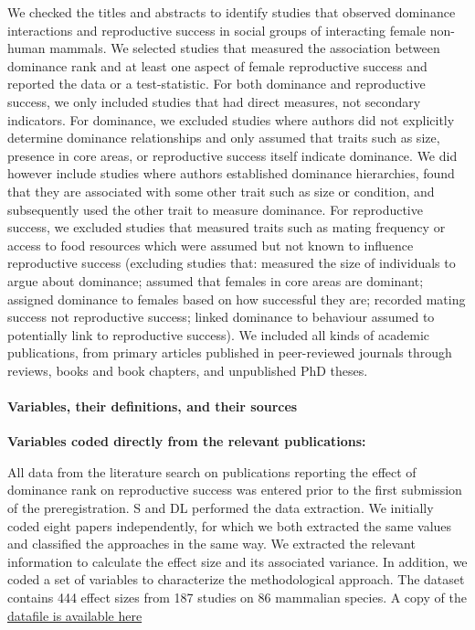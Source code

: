 \documentclass[
]{article}
\begin{document}
We checked the titles and abstracts to identify studies that observed
dominance interactions and reproductive success in social groups of
interacting female non-human mammals. We selected studies that measured
the association between dominance rank and at least one aspect of female
reproductive success and reported the data or a test-statistic. For both
dominance and reproductive success, we only included studies that had
direct measures, not secondary indicators. For dominance, we excluded
studies where authors did not explicitly determine dominance
relationships and only assumed that traits such as size, presence in
core areas, or reproductive success itself indicate dominance. We did
however include studies where authors established dominance hierarchies,
found that they are associated with some other trait such as size or
condition, and subsequently used the other trait to measure dominance.
For reproductive success, we excluded studies that measured traits such
as mating frequency or access to food resources which were assumed but
not known to influence reproductive success (excluding studies that:
measured the size of individuals to argue about dominance; assumed that
females in core areas are dominant; assigned dominance to females based
on how successful they are; recorded mating success not reproductive
success; linked dominance to behaviour assumed to potentially link to
reproductive success). We included all kinds of academic publications,
from primary articles published in peer-reviewed journals through
reviews, books and book chapters, and unpublished PhD theses.

\hypertarget{variables-their-definitions-and-their-sources}{%
\paragraph{\texorpdfstring{\textbf{Variables, their definitions, and
their
sources}}{Variables, their definitions, and their sources}}\label{variables-their-definitions-and-their-sources}}

\hfill\break
\textbf{Variables coded directly from the relevant publications:}

All data from the literature search on publications reporting the effect
of dominance rank on reproductive success was entered prior to the first
submission of the preregistration. S and DL performed the data
extraction. We initially coded eight papers independently, for which we
both extracted the same values and classified the approaches in the same
way. We extracted the relevant information to calculate the effect size
and its associated variance. In addition, we coded a set of variables to
characterize the methodological approach. The dataset contains 444
effect sizes from 187 studies on 86 mammalian species. A copy of the
\href{https://github.com/dieterlukas/FemaleDominanceReproduction_MetaAnalysis}{datafile
is available here}
\end{document}
